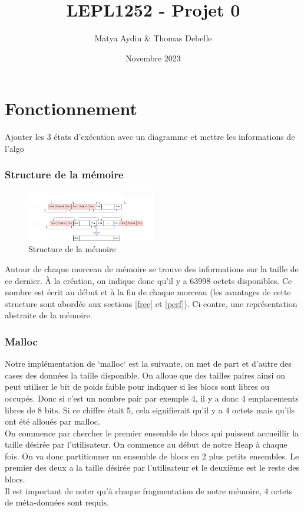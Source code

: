 \documentclass{article}
\title{LEPL1252 - Projet 0}
\author{Matya Aydin \& Thomas Debelle}
\date{Novembre 2023}
\begin{document}
\maketitle

\section{Fonctionnement}


Ajouter les 3 états d'exécution avec un diagramme et mettre les informations de l'algo

\subsubsection{Structure de la mémoire}

\begin{figure}
    \centering
    \includegraphics[width=0.5\textwidth, trim = {0 1.6cm 0 1.5cm}, clip]{fonctionnement.png}
    \caption{Structure de la mémoire}
    \label{fct}

\end{figure}

Autour de chaque morceau de mémoire se trouve des informations sur la taille de ce dernier. À la création, on indique donc qu'il y a 63998 octets disponibles. Ce nombre est écrit au début et à la fin de chaque morceau (les avantages de cette structure sont abordés aux sections \ref{free} et \ref{perf}). Ci-contre, une représentation abstraite de la mémoire.

\subsubsection{Malloc}
Notre implémentation de `malloc` est la suivante, on met de part et d'autre des cases des données la taille disponible. On alloue que des tailles paires ainsi on peut utiliser le bit de poids faible pour indiquer si les blocs sont libres ou occupés. Donc si c'est un nombre pair par exemple 4, il y a donc 4 emplacements libres de 8 bits. Si ce chiffre était 5, cela signifierait qu'il y a 4 octets mais qu'ils ont été alloués par malloc.\\
On commence par chercher le premier ensemble de blocs qui puissent accueillir la taille désirée par l'utilisateur. On commence au début de notre Heap à chaque fois. On va donc partitionner un ensemble de blocs en 2 plus petits ensembles. Le premier des deux a la taille désirée par l'utilisateur et le deuxième est le reste des blocs.\\
Il est important de noter qu'à chaque fragmentation de notre mémoire, 4 octets de méta-données sont requis.
\end{document}
